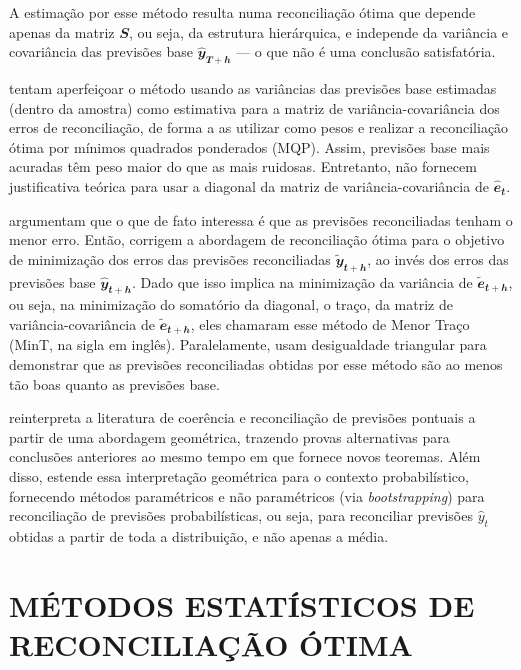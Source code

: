 \documentclass[
  12pt,
  oneside,
  a4paper,
  chapter=TITLE,
  section=TITLE,
  subsubsection=TITLE,
  brazil]{abntex2}
\begin{document}
A estimação por esse método resulta numa reconciliação ótima que depende
apenas da matriz \(\mathbfit{S}\), ou seja, da estrutura hierárquica, e
independe da variância e covariância das previsões base
\(\mathbfit{\hat{y}_{T+h}}\) --- o que não é uma conclusão satisfatória.

\textcite{hyndman2016} tentam aperfeiçoar o método usando as variâncias
das previsões base estimadas (dentro da amostra) como estimativa para a
matriz de variância-covariância dos erros de reconciliação, de forma a
as utilizar como pesos e realizar a reconciliação ótima por mínimos
quadrados ponderados (MQP). Assim, previsões base mais acuradas têm peso
maior do que as mais ruidosas. Entretanto, não fornecem justificativa
teórica para usar a diagonal da matriz de variância-covariância de
\(\mathbfit{\hat{e}_{t}}\).

\textcite{wickramasuriya2019} argumentam que o que de fato interessa é
que as previsões reconciliadas tenham o menor erro. Então, corrigem a
abordagem de reconciliação ótima para o objetivo de minimização dos
erros das previsões reconciliadas \(\mathbfit{\tilde{y}_{t+h}}\), ao
invés dos erros das previsões base \(\mathbfit{\hat{y}_{t+h}}\). Dado
que isso implica na minimização da variância de
\(\mathbfit{\tilde{e}_{t+h}}\), ou seja, na minimização do somatório da
diagonal, o traço, da matriz de variância-covariância de
\(\mathbfit{\tilde{e}_{t+h}}\), eles chamaram esse método de Menor Traço
(MinT, na sigla em inglês). Paralelamente, usam desigualdade triangular
para demonstrar que as previsões reconciliadas obtidas por esse método
são ao menos tão boas quanto as previsões base.

\textcite{panagiotelis2021} reinterpreta a literatura de coerência e
reconciliação de previsões pontuais a partir de uma abordagem
geométrica, trazendo provas alternativas para conclusões anteriores ao
mesmo tempo em que fornece novos teoremas. Além disso,
\textcite{panagiotelis2021} estende essa interpretação geométrica para o
contexto probabilístico, fornecendo métodos paramétricos e não
paramétricos (via \emph{bootstrapping}) para reconciliação de previsões
probabilísticas, ou seja, para reconciliar previsões \(\hat{y}_t\)
obtidas a partir de toda a distribuição, e não apenas a média.

\hypertarget{muxe9todos-estatuxedsticos-de-reconciliauxe7uxe3o-uxf3tima}{%
\section{MÉTODOS ESTATÍSTICOS DE RECONCILIAÇÃO
ÓTIMA}\label{muxe9todos-estatuxedsticos-de-reconciliauxe7uxe3o-uxf3tima}}
\end{document}
